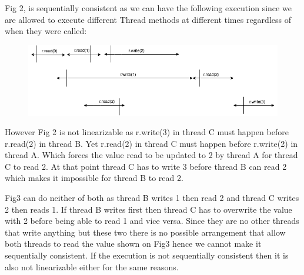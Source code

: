 \documentclass[11pt,letterpaper]{exam}
\begin{document}
\begin{questions}
		\newpage
		\question
		Fig 2, is sequentially consistent as we can have the following execution since we are allowed to execute different Thread methods at different times regardless of when they were called:
		\begin{figure}[h!]
			\centering
			\includegraphics[scale=0.4]{Fig2Sequential}
		\end{figure}
		
		However Fig 2 is not linearizable as r.write(3) in thread C must happen before r.read(2) in thread B. Yet r.read(2) in thread C must happen before r.write(2) in thread A. Which forces the value read to be updated to 2 by thread A for thread C to read 2. At that point thread C has to write 3 before thread B can read 2 which makes it impossible for thread B to read 2.
		
		Fig3 can do neither of both as thread B writes 1 then read 2 and thread C writes 2 then reads 1. If thread B writes first then thread C has to overwrite the value with 2 before being able to read 1 and vice versa. Since they are no other threads that write anything but these two there is no possible arrangement that allow both threads to read the value shown on Fig3 hence we cannot make it sequentially consistent. If the execution is not sequentially consistent then it is also not linearizable either for the same reasons.
		
		\question
\end{questions}
\end{document}
